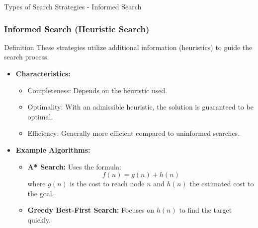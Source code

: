 \documentclass[aspectratio=169]{beamer}
\begin{document}
\begin{frame}[fragile]{Types of Search Strategies - Informed Search}
    \frametitle{Informed Search (Heuristic Search)}
    \begin{block}{Definition}
        These strategies utilize additional information (heuristics) to guide the search process.
    \end{block}
    
    \begin{itemize}
        \item \textbf{Characteristics:}
        \begin{itemize}
            \item Completeness: Depends on the heuristic used.
            \item Optimality: With an admissible heuristic, the solution is guaranteed to be optimal.
            \item Efficiency: Generally more efficient compared to uninformed searches.
        \end{itemize}
        
        \item \textbf{Example Algorithms:}
        \begin{itemize}
            \item \textbf{A* Search:} Uses the formula:
            \begin{equation}
                f(n) = g(n) + h(n)
            \end{equation}
            where \( g(n) \) is the cost to reach node \( n \) and \( h(n) \) the estimated cost to the goal.
            \item \textbf{Greedy Best-First Search:} Focuses on \( h(n) \) to find the target quickly.
        \end{itemize}
    \end{itemize}
\end{frame}
\end{document}
